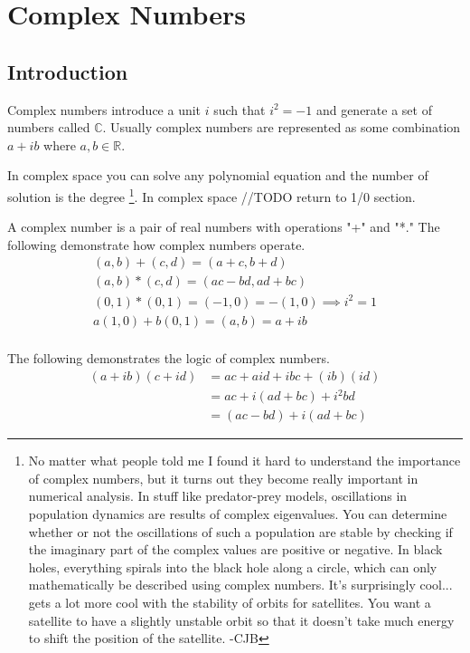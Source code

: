 \section{Complex Numbers}

	\subsection{Introduction}
	
		Complex numbers introduce a unit $i$ such that $i^2 = -1$ and generate a set of numbers called $\mathbb{C}$.
		Usually complex numbers are represented as some combination $a + ib$ where $a, b \in \mathbb{R}$.
		
		In complex space you can solve any polynomial equation and the number of solution is the degree \footnote{No matter what people told me I found it hard to understand the importance of complex numbers, but it turns out they become really important in numerical analysis.  In stuff like predator-prey models, oscillations in population dynamics are results of complex eigenvalues.  You can determine whether or not the oscillations of such a population are stable by checking if the imaginary part of the complex values are positive or negative.  In black holes, everything spirals into the black hole along a circle, which can only mathematically be described using complex numbers.  It's surprisingly cool... gets a lot more cool with the stability of orbits for satellites.  You want a satellite to have a slightly unstable orbit so that it doesn't take much energy to shift the position of the satellite. -CJB}.
		In complex space //TODO return to 1/0 section.
		
		A complex number is a pair of real numbers with operations "+" and "*."
		The following demonstrate how complex numbers operate.
		\begin{align}
			(a,b) + (c,d) = (a+c, b+d) \\
			(a,b) * (c,d) = (ac - bd, ad + bc) \\
			(0,1) * (0,1) = (-1,0) = -(1,0) \implies i^2 = 1 \\
			a(1,0) + b(0,1) = (a,b) = a + ib \\
		\end{align}
		
		
		The following demonstrates the logic of complex numbers.
		\begin{align}
			(a+ib)(c+id) &=ac + aid + ibc + (ib)(id) \\
					&= ac + i(ad + bc) + i^2bd \\
					&= (ac - bd) + i(ad+bc)
		\end{align}
		

